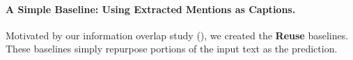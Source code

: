 
\paragraph{A Simple Baseline: Using Extracted Mentions as Captions.}
Motivated by our information overlap study (),
we created the \textbf{Reuse} baselines. 
These baselines simply repurpose portions of the input text as the prediction.


